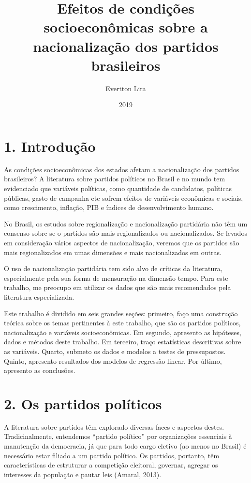 \documentclass[]{article}
\title{Efeitos de condições socioeconômicas sobre a nacionalização dos partidos
brasileiros}
\author{Evertton Lira}
\date{2019}
\begin{document}
\maketitle

\section{1. Introdução}\label{introducao}

As condições socioeconômicas dos estados afetam a nacionalização dos
partidos brasileiros? A literatura sobre partidos políticos no Brasil e
no mundo tem evidenciado que variáveis políticas, como quantidade de
candidatos, políticas públicas, gasto de campanha etc sofrem efeitos de
variáveis econômicas e sociais, como crescimento, inflação, PIB e
índices de desenvolvimento humano.

No Brasil, os estudos sobre regionalização e nacionalização partidária
não têm um consenso sobre se o partidos são mais regionalizados ou
nacionalizados. Se levados em consideração vários aspectos de
nacionalização, veremos que os partidos são mais regionalizados em umas
dimensões e mais nacionalizados em outras.

O uso de nacionalização partidária tem sido alvo de críticas da
literatura, especialmente pela sua forma de mensuração na dimensão
tempo. Para este trabalho, me preocupo em utilizar os dados que são mais
recomendados pela literatura especializada.

Este trabalho é dividido em seis grandes seções: primeiro, faço uma
construção teórica sobre os temas pertinentes à este trabalho, que são
os partidos políticos, nacionalização e variáveis socioeconômicas. Em
segundo, apresento as hipóteses, dados e métodos deste trabalho. Em
terceiro, traço estatísticas descritivas sobre as variáveis. Quarto,
submeto os dados e modelos a testes de pressupostos. Quinto, apresento
resultados dos modelos de regressão linear. Por último, apresento as
conclusões.

\section{2. Os partidos políticos}\label{os-partidos-politicos}

A literatura sobre partidos têm explorado diversas faces e aspectos
destes. Tradicinalmente, entendemos ``partido político'' por
organizações essenciais à manutenção da democracia, já que para todo
cargo eletivo (ao menos no Brasil) é necessário estar filiado a um
partido político. Os partidos, portanto, têm características de
estruturar a competição eleitoral, governar, agregar os interesses da
população e pautar leis (Amaral, 2013).
\end{document}
